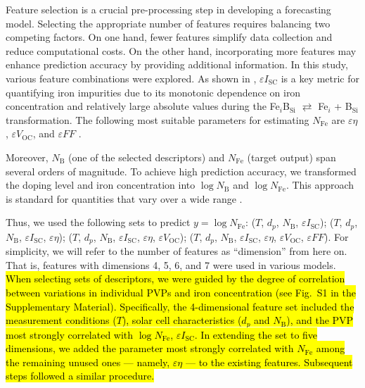 \documentclass[a4paper,fleqn,draft]{cas-sc}
\begin{document}
Feature selection is a crucial pre-processing step in developing a forecasting model.
Selecting the appropriate number of features requires balancing two competing factors.
On one hand, fewer features simplify data collection and reduce computational costs.
On the other hand, incorporating more features may enhance prediction accuracy by providing additional information.
In this study, various feature combinations were explored.
As shown in \cite{Olikh2025MSEB}, $\varepsilon I_\mathrm{SC}$ is a key metric for quantifying iron impurities
due to its monotonic dependence on iron concentration and relatively large absolute values during the
Fe$_i$B$_\mathrm{Si}$ $\rightleftarrows$ Fe$_i$ + B$_\mathrm{Si}$
transformation.
The following most suitable parameters for estimating $N_\mathrm{Fe}$ are
$\varepsilon \eta$, $\varepsilon V_\mathrm{OC}$, and $\varepsilon F\!F$ \cite{Olikh2025MSEB}.

Moreover, $N_\mathrm{B}$ (one of the selected descriptors) and
$N_\mathrm{Fe}$ (target output) span several orders of magnitude.
To achieve high prediction accuracy, we transformed the doping level and iron concentration into
$\log N_\mathrm{B}$ and $\log N_\mathrm{Fe}$.
This approach is standard for quantities that vary over a wide range \cite{Srivastava2023, Minagawa2024}.

Thus, we used the following sets to predict $y = \log N_\mathrm{Fe}$:
($T$, $d_p$, $N_\mathrm{B}$, $\varepsilon I_\mathrm{SC}$);
($T$, $d_p$, $N_\mathrm{B}$, $\varepsilon I_\mathrm{SC}$, $\varepsilon \eta$);
($T$, $d_p$, $N_\mathrm{B}$, $\varepsilon I_\mathrm{SC}$, $\varepsilon \eta$, $\varepsilon V_\mathrm{OC}$);
($T$, $d_p$, $N_\mathrm{B}$, $\varepsilon I_\mathrm{SC}$, $\varepsilon \eta$, $\varepsilon V_\mathrm{OC}$, $\varepsilon F\!F$).
For simplicity, we will refer to the number of features as ``dimension'' from here on.
That is, features with dimensions 4, 5, 6, and 7 were used in various models.
\textcolor[rgb]{1.00,0.07,0.00}{
\hl{
When selecting sets of descriptors, we were guided by the degree of correlation between variations in individual PVPs and iron concentration
(see Fig.~S1 in the Supplementary Material).
Specifically, the 4-dimensional feature set included the measurement conditions ($T$),
solar cell characteristics ($d_p$ and $N_\mathrm{B}$), and the PVP most strongly correlated with $\log N_\mathrm{Fe}$, $\varepsilon I_\mathrm{SC}$.
In extending the set to five dimensions, we added the parameter most strongly correlated with $N_\mathrm{Fe}$
among the remaining unused ones --- namely,  $\varepsilon \eta$  --- to the existing features.
Subsequent steps followed a similar procedure.
}}
\end{document}
